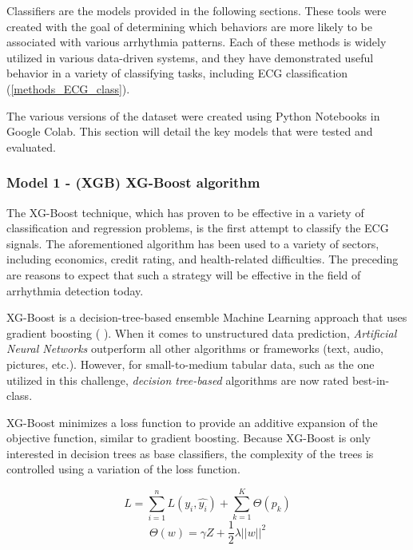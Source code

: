 Classifiers are the models provided in the following sections. These tools were created with the goal of determining which behaviors are more likely to be associated with various arrhythmia patterns. Each of these methods is widely utilized in various data-driven systems, and they have demonstrated useful behavior in a variety of classifying tasks, including ECG classification (\ref{methods_ECG_class}).

The various versions of the dataset were created using Python Notebooks in Google Colab. This section will detail the key models that were tested and evaluated.

\subsubsection{Model 1 - (XGB) XG-Boost algorithm} \label{3model1}

The XG-Boost technique, which has proven to be effective in a variety of classification and regression problems, is the first attempt to classify the ECG signals. The aforementioned algorithm has been used to a variety of sectors, including economics, credit rating, and health-related difficulties. The preceding are reasons to expect that such a strategy will be effective in the field of arrhythmia detection today.

XG-Boost is a decision-tree-based ensemble Machine Learning approach that uses gradient boosting (\cite{xgb1} \cite{xgb2}). When it comes to unstructured data prediction, \textit{Artificial Neural Networks} outperform all other algorithms or frameworks (text, audio, pictures, etc.). However, for small-to-medium tabular data, such as the one utilized in this challenge, \textit{decision tree-based} algorithms are now rated best-in-class.

XG-Boost minimizes a loss function to provide an additive expansion of the objective function, similar to gradient boosting. Because XG-Boost is only interested in decision trees as base classifiers, the complexity of the trees is controlled using a variation of the loss function.

\begin{equation}
L = \sum_{i=1}^{n}{L(y_i,\hat{y_i})}+\sum_{k=1}^{K}{\Theta(p_k)}
\end{equation}
\begin{equation}
\Theta(w)=\gamma Z+\frac{1}{2} \lambda ||w||^2
\end{equation}

\noindent

